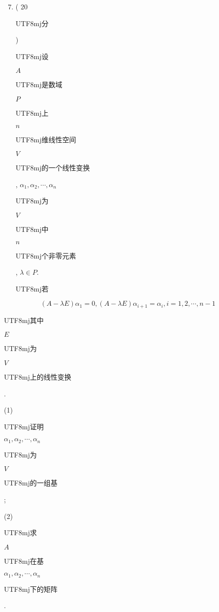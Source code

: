 \documentclass[10pt]{article}
\begin{document}
\begin{enumerate}
  \setcounter{enumi}{6}
  \item ( 20 \begin{CJK}{UTF8}{mj}分\end{CJK}) \begin{CJK}{UTF8}{mj}设\end{CJK} $A$ \begin{CJK}{UTF8}{mj}是数域\end{CJK} $P$ \begin{CJK}{UTF8}{mj}上\end{CJK} $n$ \begin{CJK}{UTF8}{mj}维线性空间\end{CJK} $V$ \begin{CJK}{UTF8}{mj}的一个线性变换\end{CJK}, $\alpha_{1}, \alpha_{2}, \cdots, \alpha_{n}$ \begin{CJK}{UTF8}{mj}为\end{CJK} $V$ \begin{CJK}{UTF8}{mj}中\end{CJK} $n$ \begin{CJK}{UTF8}{mj}个非零元素\end{CJK}, $\lambda \in P$. \begin{CJK}{UTF8}{mj}若\end{CJK}
\end{enumerate}
$$
(A-\lambda E) \alpha_{1}=0,(A-\lambda E) \alpha_{i+1}=\alpha_{i}, i=1,2, \cdots, n-1
$$
\begin{CJK}{UTF8}{mj}其中\end{CJK} $E$ \begin{CJK}{UTF8}{mj}为\end{CJK} $V$ \begin{CJK}{UTF8}{mj}上的线性变换\end{CJK}.

(1) \begin{CJK}{UTF8}{mj}证明\end{CJK} $\alpha_{1}, \alpha_{2}, \cdots, \alpha_{n}$ \begin{CJK}{UTF8}{mj}为\end{CJK} $V$ \begin{CJK}{UTF8}{mj}的一组基\end{CJK};

(2) \begin{CJK}{UTF8}{mj}求\end{CJK} $A$ \begin{CJK}{UTF8}{mj}在基\end{CJK} $\alpha_{1}, \alpha_{2}, \cdots, \alpha_{n}$ \begin{CJK}{UTF8}{mj}下的矩阵\end{CJK}.
\end{document}
